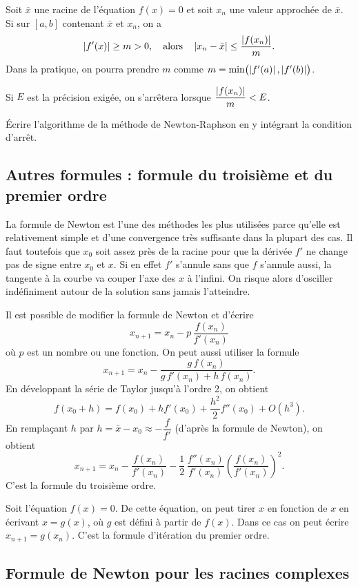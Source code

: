 Soit $\bar{x}$ une racine de l'équation $f(x) = 0$ et soit $x_n$ une valeur
approchée de $\bar{x}$. Si sur $[a,b]$ contenant $\bar{x}$ et $x_n$, on a
\[
  \left|f'(x)\right| \ge m > 0, \quad \text{alors} \quad
  \left|x_n - \bar{x}\right| \le \frac{\left|f(x_n)\right|}{m} .
\]
Dans la pratique, on pourra prendre $m$ comme
$m = \min\bigl(\left|f'(a)\right|, \left|f'(b)\right|\bigr)$.

Si $E$ est la précision exigée, on s'arrêtera lorsque
$\dfrac{\left|f(x_n)\right|}{m} < E$.

\begin{exercice}
Écrire l'algorithme de la méthode de Newton-Raphson en y intégrant la
condition d'arrêt.
\end{exercice}

\subsection{Autres formules : formule du troisième et du premier ordre}

La formule de Newton est l'une des méthodes les plus utilisées parce qu'elle
est relativement simple et d'une convergence très suffisante dans la plupart
des cas. Il faut toutefois que $x_0$ soit assez près de la racine pour que la
dérivée $f'$ ne change pas de signe entre $x_0$ et $x$. Si en effet $f'$
s'annule sans que $f$ s'annule aussi, la tangente à la courbe va couper l'axe
des $x$ à l'infini. On risque alors d'osciller indéfiniment autour de la
solution sans jamais l'atteindre.

Il est possible de modifier la formule de Newton et d'écrire
\[
  x_{n+1} = x_n - p\,\frac{f(x_n)}{f'(x_n)}
\]
où $p$ est un nombre ou une fonction. On peut aussi utiliser la formule
\[
  x_{n+1} = x_n - \frac{g\,f(x_n)}{g\,f'(x_n) + h\,f(x_n)} .
\]
En développant la série de Taylor jusqu'à l'ordre 2, on obtient
\[
  f(x_0 + h) = f(x_0) + h f'(x_0) + \frac{h^2}{2} f''(x_0) + O(h^3) .
\]
En remplaçant $h$ par $h = \bar{x} - x_0 \approx -\dfrac{f}{f'}$ (d'après la
formule de Newton), on obtient
\[
  x_{n+1} = x_n - \frac{f(x_n)}{f'(x_n)}
          - \frac{1}{2}\,\frac{f''(x_n)}{f'(x_n)}
            \left(\frac{f(x_n)}{f'(x_n)}\right)^{2} .
\]
C'est la formule du troisième ordre.

Soit l'équation $f(x) = 0$. De cette équation, on peut tirer $x$ en fonction
de $x$ en écrivant $x = g(x)$, où $g$ est défini à partir de $f(x)$. Dans ce
cas on peut écrire $x_{n+1} = g(x_n)$. C'est la formule d'itération du premier
ordre.

\subsection{Formule de Newton pour les racines complexes}


